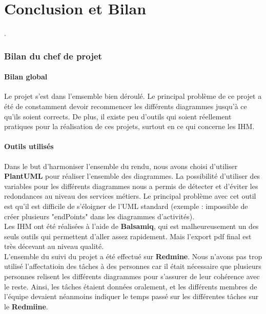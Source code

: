 \part{Conclusion et Bilan}
\setcounter{section}{0}

.

\section{Bilan du chef de projet}

\subsection{Bilan global}
Le projet s'est dans l'emsemble bien déroulé. Le principal problème de ce projet a été de constamment devoir recommencer les différents diagrammes jusqu'à ce qu'ils soient corrects. De plus, il existe peu d'outils qui soient réellement pratiques pour la réalisation de ces projets, surtout en ce qui concerne les IHM.

\subsection{Outils utilisés}
Dans le but d'harmoniser l'ensemble du rendu, nous avons choisi d'utiliser \textbf{PlantUML} pour réaliser l'ensemble des diagrammes. La possibilité d'utiliser des variables pour les différents diagrammes nous a permis de détecter et d'éviter les redondances au niveau des services métiers. Le principal problème avec cet outil est qu'il est difficile de s'éloigner de l'UML standard (exemple : impossible de créer plusieurs "endPoints" dans les diagrammes d'activités).\\

Les IHM ont été réalisées à l'aide de \textbf{Balsamiq}, qui est malheureusement un des seuls outils qui permettent d'aller assez rapidement. Mais l'export pdf final est très décevant au niveau qualité. \\

L'ensemble du suivi du projet a été effectué sur \textbf{Redmine}. Nous n'avons pas trop utilisé l'affectatioin des tâches à des personnes car il était nécessaire que plusieurs personnes relisent les différents diagrammes pour s'assurer de leur cohérence avec le reste. Ainsi, les tâches étaient données oralement, et les différents membres de l'équipe devaient néanmoins indiquer le temps passé sur les différentes tâches sur le \textbf{Redmiine}.

